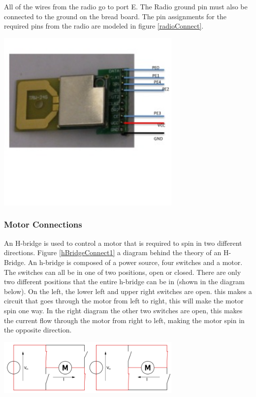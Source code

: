 All of the wires from the radio go to port E. The Radio ground pin must also be connected to the ground on the bread board. The pin assignments for the required pins from the radio are modeled in figure \ref{radioConnect}.

\begin{minipage}{6.5in}
  \centering

    \includegraphics[width=90mm]{imageSources/radioConnect.png}
  
  \label{radioConnect}
\end{minipage}

\subsubsection{Motor Connections}
An H-bridge is used to  control a motor that is required to spin in two different directions. Figure \ref{hBridgeConnect1} a diagram behind the theory of an H-Bridge\cite{hbridgewiki}. An h-bridge is composed of a power source, four switches and a motor. The switches can all be in one of two positions, open or closed. There are only two different positions that the entire h-bridge can be in (shown in the diagram below). On the left, the lower left and upper right switches are open. this makes a circuit that goes through the motor from left to right, this will make the motor spin one way.  In the right diagram the other two switches are open, this makes the current flow through the motor from right to left, making the motor spin in the opposite direction.

\begin{minipage}{6.5in}
  \centering
    \includegraphics[width=90mm]{imageSources/hBridgeConnect1.png}
  
  \label{hBridgeConnect1}
\end{minipage}


